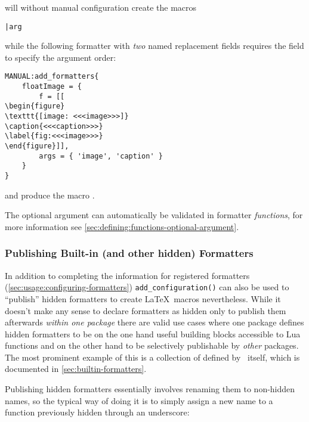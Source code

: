 \documentclass[12pt]{scrartcl}
\begin{document}
\noindent will without manual configuration create the macros

\begin{itemize*}
\item \texttt{\foo}
\item \texttt{\bar{arg}}
\item \texttt{}
\end{itemize*}

\noindent while the following formatter with \emph{two} named replacement fields requires the  field to specify the argument order:

\begin{verbatim}
MANUAL:add_formatters{
	floatImage = {
		f = [[
\begin{figure}
\texttt{[image: <<<image>>>]}
\caption{<<<caption>>>}
\label{fig:<<<image>>>}
\end{figure}]],
		args = { 'image', 'caption' }
	}
}
\end{verbatim}

\noindent and produce the macro \texttt{}.

The optional argument can automatically be validated in formatter
\emph{functions}, for more information see
\vref{sec:defining:functions-optional-argument}.

\subsubsection{Publishing Built-in (and other hidden) Formatters}
\label{sec:usage:publishing-builtin-formatters}

In addition to completing the information for registered formatters
(\vref{sec:usage:configuring-formatters}) \texttt{add_configuration()} can
also be used to “publish” hidden formatters to create \LaTeX\ macros
nevertheless.  While it doesn't make any sense to declare formatters as hidden
only to publish them afterwards \emph{within one package} there are valid use
cases where one package defines hidden formatters to be on the one hand useful
building blocks accessible to Lua functions and on the other hand to be
selectively publishable by \emph{other} packages.  The most prominent example of
this is a collection of  defined by
\luatemplates\ itself, which is documented in
\vref{sec:builtin-formatters}.

Publishing hidden formatters essentially involves renaming them to non-hidden names, so the typical way of doing it is to simply assign a new name to a function previously hidden through an underscore:
\end{document}

